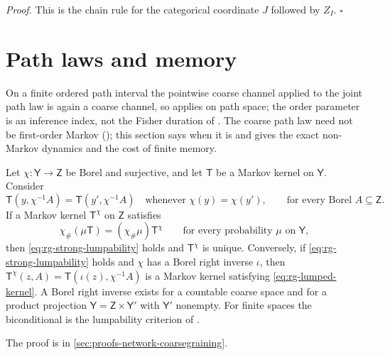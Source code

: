 \noindent\emph{Proof.}
This is the chain rule  for the categorical coordinate
$J$ followed by $Z_I$. $\square$

\section{Path laws and memory}
\label{sec:rg-path-space}

On a finite ordered path interval the pointwise coarse channel applied to the joint
path law is again a coarse channel, so  applies on
path space; the order parameter is an inference index, not the Fisher duration of
. The coarse path law need not be first-order Markov
(); this section says when it is and gives the
exact non-Markov dynamics and the cost of finite memory.

Let $\chi:\mathsf Y\to\mathsf Z$ be Borel and surjective, and let $\mathsf T$ be a
Markov kernel on $\mathsf Y$. Consider
\begin{equation}
\mathsf T(y,\chi^{-1}A)=\mathsf T(y',\chi^{-1}A)
\quad\text{whenever }\chi(y)=\chi(y'),
\qquad\text{for every Borel }A\subseteq\mathsf Z.
\label{eq:rg-strong-lumpability}
\end{equation}
If a Markov kernel $\mathsf T^\chi$ on $\mathsf Z$ satisfies
\begin{equation}
\chi_\#(\mu\mathsf T)=(\chi_\#\mu)\mathsf T^\chi
\qquad\text{for every probability }\mu\text{ on }\mathsf Y,
\label{eq:rg-lumped-kernel}
\end{equation}
then \eqref{eq:rg-strong-lumpability} holds and $\mathsf T^\chi$ is unique.
Conversely, if \eqref{eq:rg-strong-lumpability} holds and $\chi$ has a Borel right
inverse $\iota$, then $\mathsf T^\chi(z,A)=\mathsf T(\iota(z),\chi^{-1}A)$ is a
Markov kernel satisfying \eqref{eq:rg-lumped-kernel}. A Borel right inverse exists
for a countable coarse space and for a product projection
$\mathsf Y=\mathsf Z\times\mathsf Y'$ with $\mathsf Y'$ nonempty. For finite spaces
the biconditional is the lumpability criterion of \citet[Thm.~6.3.2]{KemenySnell1976}.

The proof is in \cref{sec:proofs-network-coarsegraining}.

